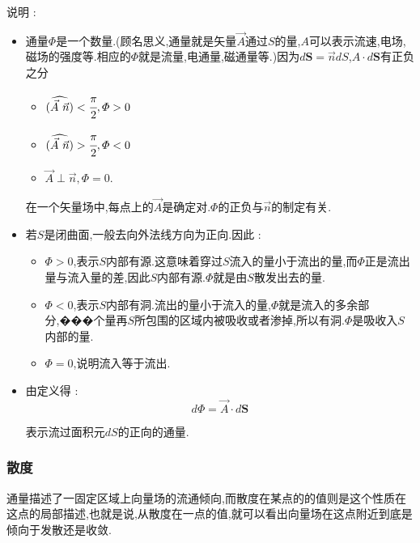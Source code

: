 \documentclass[UTF8,12pt]{ctexbook}
\newcommand{\vecAngle}[2]{(\widehat{#1\ #2})}
\begin{document}
{{{{{      说明 :
      \begin{itemize}
        \item {通量$\varPhi$是一个数量.(顾名思义,通量就是矢量$\vec{A}$通过$S$的量,$A$可以表示流速,电场,磁场的强度等.相应的$\varPhi$就是流量,电通量,磁通量等.)因为$d\mathbf{S} = \vec{n}dS$,$A\cdot d\mathbf{S}$有正负之分

              \begin{itemize}
                \item $\vecAngle{\vec{A}}{\vec{n}} < \cfrac{\pi}{2},\varPhi > 0$
                \item $\vecAngle{\vec{A}}{\vec{n}} > \cfrac{\pi}{2},\varPhi < 0$
                \item $\vec{A} \perp \vec{n},\varPhi = 0$.
              \end{itemize}

              在一个矢量场中,每点上的$\vec{A}$是确定对.$\varPhi$的正负与$\vec{n}$的制定有关.
              }
        \item {
              若$S$是闭曲面,一般去向外法线方向为正向.因此 :

              \begin{itemize}
                \item $\varPhi > 0$,表示$S$内部有源.这意味着穿过$S$流入的量小于流出的量,而$\varPhi$正是流出量与流入量的差,因此$S$内部有源.$\varPhi$就是由$S$散发出去的量.
                \item $\varPhi < 0$,表示$S$内部有洞.流出的量小于流入的量,$\varPhi$就是流入的多余部分,���个量再$S$所包围的区域内被吸收或者渗掉,所以有洞.$\varPhi$是吸收入$S$内部的量.
                \item $\varPhi = 0$,说明流入等于流出.
              \end{itemize}
              }
        \item {
              由定义得 :
              $$
                d\varPhi = \vec{A} \cdot d\mathbf{S}
              $$

              表示流过面积元$dS$的正向的通量.
              }
      \end{itemize}
    }%

    \subsubsection{散度}{
      通量描述了一固定区域上向量场的流通倾向,而散度在某点的的值则是这个性质在这点的局部描述,也就是说,从散度在一点的值,就可以看出向量场在这点附近到底是倾向于发散还是收敛.

}}}}}
\end{document}
